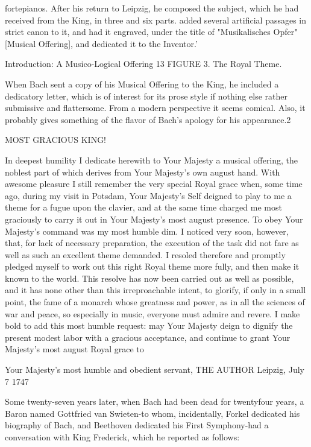 fortepianos. After his return to Leipzig, he composed the subject, which he had received from the King, in three and six parts. added several artificial passages in strict canon to it, and had it engraved, under the title of "Musikalisches Opfer" [Musical Offering], and dedicated it to the Inventor.' 







Introduction: A Musico-Logical Offering   13 FIGURE 3. The Royal Theme. 

When Bach sent a copy of his Musical Offering to the King, he included a dedicatory letter, which is of interest for its prose style if nothing else rather submissive and flattersome. From a modern perspective it seems comical. Also, it probably gives something of the flavor of Bach's apology for his appearance.2 

MOST GRACIOUS KING! 

In deepest humility I dedicate herewith to Your Majesty a musical offering, the noblest part of which derives from Your Majesty's own august hand. With awesome pleasure I still remember the very special Royal grace when, some time ago, during my visit in Potsdam, Your Majesty's Self deigned to play to me a theme for a fugue upon the clavier, and at the same time charged me most graciously to carry it out in Your Majesty's most august presence. To obey Your Majesty's command was my most humble dim. I noticed very soon, however, that, for lack of necessary preparation, the execution of the task did not fare as well as such an excellent theme demanded. I resoled therefore and promptly pledged myself to work out this right Royal theme more fully, and then make it known to the world. This resolve has now been carried out as well as possible, and it has none other than this irreproachable intent, to glorify, if only in a small point, the fame of a monarch whose greatness and power, as in all the sciences of war and peace, so especially in music, everyone must admire and revere. I make bold to add this most humble request: may Your Majesty deign to dignify the present modest labor with a gracious acceptance, and continue to grant Your Majesty's most august Royal grace to 

Your Majesty's most humble and obedient servant, THE AUTHOR Leipzig, July 7 1747 

Some twenty-seven years later, when Bach had been dead for twentyfour years, a Baron named Gottfried van Swieten-to whom, incidentally, Forkel dedicated his biography of Bach, and Beethoven dedicated his First Symphony-had a conversation with King Frederick, which he reported as follows: 

